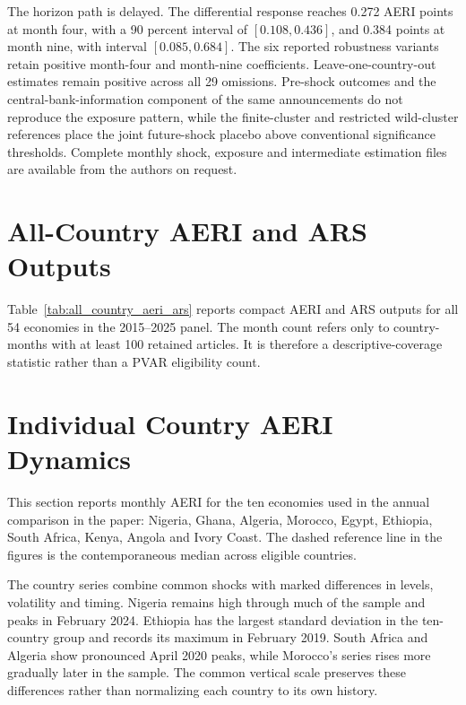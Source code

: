 \documentclass[11pt]{article}
\begin{document}




The horizon path is delayed. The differential response reaches 0.272 AERI points at month four, with a 90 percent interval of $[0.108,0.436]$, and 0.384 points at month nine, with interval $[0.085,0.684]$. The six reported robustness variants retain positive month-four and month-nine coefficients. Leave-one-country-out estimates remain positive across all 29 omissions. Pre-shock outcomes and the central-bank-information component of the same announcements do not reproduce the exposure pattern, while the finite-cluster and restricted wild-cluster references place the joint future-shock placebo above conventional significance thresholds. Complete monthly shock, exposure and intermediate estimation files are available from the authors on request.

\section{All-Country AERI and ARS Outputs}
Table~\ref{tab:all_country_aeri_ars} reports compact AERI and ARS outputs for all 54 economies in the 2015--2025 panel. The month count refers only to country-months with at least 100 retained articles. It is therefore a descriptive-coverage statistic rather than a PVAR eligibility count.

\begin{landscape}

\end{landscape}

\section{Individual Country AERI Dynamics}
This section reports monthly AERI for the ten economies used in the annual comparison in the paper: Nigeria, Ghana, Algeria, Morocco, Egypt, Ethiopia, South Africa, Kenya, Angola and Ivory Coast. The dashed reference line in the figures is the contemporaneous median across eligible countries.



The country series combine common shocks with marked differences in levels, volatility and timing. Nigeria remains high through much of the sample and peaks in February 2024. Ethiopia has the largest standard deviation in the ten-country group and records its maximum in February 2019. South Africa and Algeria show pronounced April 2020 peaks, while Morocco's series rises more gradually later in the sample. The common vertical scale preserves these differences rather than normalizing each country to its own history.
\end{document}
